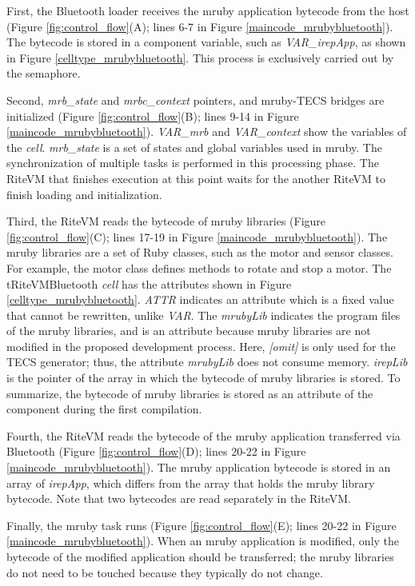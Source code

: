 \documentclass[S,R,E]{article/compsoft}
\begin{document}
First, the Bluetooth loader receives the mruby application bytecode from the host (Figure \ref{fig:control_flow}(A); lines 6-7 in Figure \ref{maincode_mrubybluetooth}).
The bytecode is stored in a component variable, such as {\it VAR\_irepApp}, as shown in Figure \ref{celltype_mrubybluetooth}.
This process is exclusively carried out by the semaphore.

Second, {\it mrb\_state} and {\it mrbc\_context} pointers, and mruby-TECS bridges are initialized (Figure \ref{fig:control_flow}(B); lines 9-14 in Figure \ref{maincode_mrubybluetooth}).
{\it VAR\_mrb} and {\it VAR\_context} show the variables of the {\it cell}.
{\it mrb\_state} is a set of states and global variables used in mruby.
The synchronization of multiple tasks is performed in this processing phase.
The RiteVM that finishes execution at this point waits for the another RiteVM to finish loading and initialization.

Third, the RiteVM reads the bytecode of mruby libraries (Figure \ref{fig:control_flow}(C); lines 17-19 in Figure \ref{maincode_mrubybluetooth}).
The mruby libraries are a set of Ruby classes, such as the motor and sensor classes.
For example, the motor class defines methods to rotate and stop a motor.
The tRiteVMBluetooth {\it cell} has the attributes shown in Figure \ref{celltype_mrubybluetooth}.
{\it ATTR} indicates an attribute which is a fixed value that cannot be rewritten, unlike {\it VAR}.
The {\it mrubyLib} indicates the program files of the mruby libraries, and is an attribute because mruby libraries are not modified in the proposed development process.
Here, {\it [omit]} is only used for the TECS generator; thus, the attribute {\it mrubyLib} does not consume memory.
{\it irepLib} is the pointer of the array in which the bytecode of mruby libraries is stored.
To summarize, the bytecode of mruby libraries is stored as an attribute of the component during the first compilation.

Fourth, the RiteVM reads the bytecode of the mruby application transferred via Bluetooth (Figure \ref{fig:control_flow}(D); lines 20-22 in Figure \ref{maincode_mrubybluetooth}).
The mruby application bytecode is stored in an array of {\it irepApp}, which differs from the array that holds the mruby library bytecode.
Note that two bytecodes are read separately in the RiteVM.

Finally, the mruby task runs (Figure \ref{fig:control_flow}(E); lines 20-22 in Figure \ref{maincode_mrubybluetooth}).
When an mruby application is modified, only the bytecode of the modified application should be transferred; the mruby libraries do not need to be touched because they typically do not change.
\end{document}
